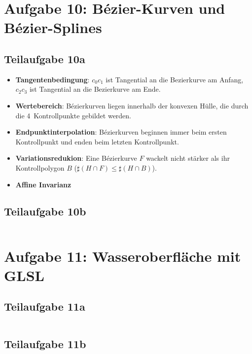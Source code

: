 \documentclass[a4paper]{scrartcl}
\begin{document}
\section*{Aufgabe 10: Bézier-Kurven und Bézier-Splines}
\subsection*{Teilaufgabe 10a}

\begin{itemize}
    \item \textbf{Tangentenbedingung}:
          $c_0 c_1$ ist Tangential an die Bezierkurve am Anfang,
          $c_2 c_3$ ist Tangential an die Bezierkurve am Ende.
    \item \textbf{Wertebereich}: Bézierkurven liegen innerhalb der konvexen
          Hülle, die durch die 4~Kontrollpunkte gebildet werden.
    \item \textbf{Endpunktinterpolation}: Bézierkurven beginnen immer beim
          ersten Kontrollpunkt und enden beim letzten Kontrollpunkt.
    \item \textbf{Variationsredukion}: Eine Bézierkurve $F$ wackelt nicht stärker
          als ihr Kontrollpolygon $B$ ($\sharp (H \cap F) \leq \sharp (H \cap B)$).
    \item \textbf{Affine Invarianz}
\end{itemize}

\clearpage
\subsection*{Teilaufgabe 10b}
\inputminted[linenos, numbersep=5pt, tabsize=4, frame=lines, label=shader.vert]{glsl}{shader.vert}

\clearpage
\section*{Aufgabe 11: Wasseroberfläche mit GLSL}
\subsection*{Teilaufgabe 11a}
\inputminted[linenos, numbersep=5pt, tabsize=4, frame=lines, label=shader.frag]{glsl}{shadera.frag}

\clearpage
\subsection*{Teilaufgabe 11b}
\inputminted[linenos, numbersep=5pt, tabsize=4, frame=lines, label=shader.frag]{glsl}{shaderb.frag}
\end{document}
